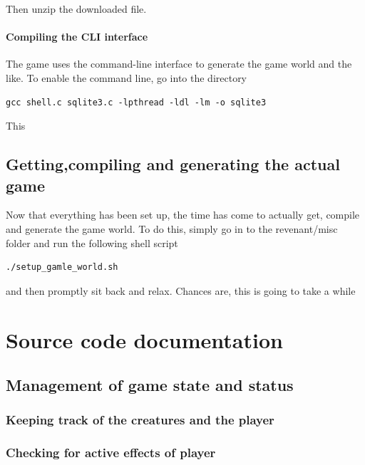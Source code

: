 \documentclass{report}
\begin{document}
Then unzip the downloaded file.
\subsubsection*{Compiling the CLI interface}
The game uses the command-line interface to generate the game world and the like. To enable the command line, go into the directory
\begin{lstlisting}
gcc shell.c sqlite3.c -lpthread -ldl -lm -o sqlite3
\end{lstlisting}
This 
\section*{Getting,compiling and generating the actual game}
Now that everything has been set up, the time has come to actually get, compile and generate the game world. To do this, simply go in to the revenant/misc folder and run the following shell script
\begin{lstlisting}
./setup_gamle_world.sh
\end{lstlisting}
and then promptly sit back and relax. Chances are, this is going to take a while
\chapter{Source code documentation}
\section{Management of game state and status}
\subsection{Keeping track of the creatures and the player}

\subsection{Checking for active effects of player}
\end{document}
